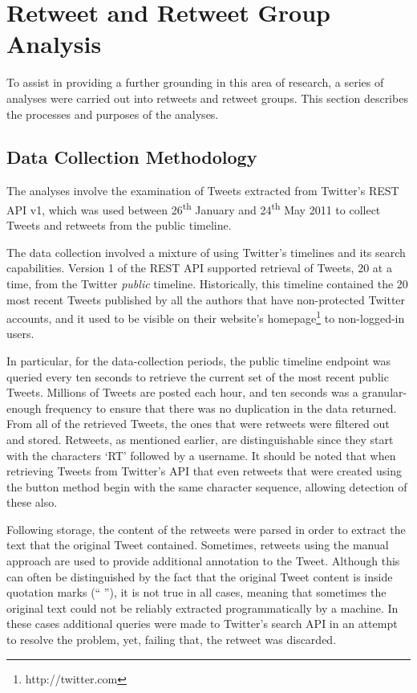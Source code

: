 \section{Retweet and Retweet Group Analysis}
To assist in providing a further grounding in this area of research, a series of analyses were carried out into retweets and retweet groups. This section describes the processes and purposes of the analyses.


\subsection{Data Collection Methodology}
The analyses involve the examination of Tweets extracted from Twitter's REST API v1, which was used between 26\textsuperscript{th} January and 24\textsuperscript{th} May 2011 to collect Tweets and retweets from the public timeline.

The data collection involved a mixture of using Twitter's timelines and its search capabilities. Version 1 of the REST API supported retrieval of Tweets, 20 at a time, from the Twitter \textit{public} timeline. Historically, this timeline contained the 20 most recent Tweets published by all the authors that have non-protected Twitter accounts, and it used to be visible on their website's homepage\footnote{http://twitter.com} to non-logged-in users.

In particular, for the data-collection periods, the public timeline endpoint was queried every ten seconds to retrieve the current set of the most recent public Tweets. Millions of Tweets are posted each hour, and ten seconds was a granular-enough frequency to ensure that there was no duplication in the data returned. From all of the retrieved Tweets, the ones that were retweets were filtered out and stored. Retweets, as mentioned earlier, are distinguishable since they start with the characters `RT' followed by a username. It should be noted that when retrieving Tweets from Twitter's API that even retweets that were created using the button method begin with the same character sequence, allowing detection of these also.

Following storage, the content of the retweets were parsed in order to extract the text that the original Tweet contained. Sometimes, retweets using the manual approach are used to provide additional annotation to the Tweet. Although this can often be distinguished by the fact that the original Tweet content is inside quotation marks (`` ''), it is not true in all cases, meaning that sometimes the original text could not be reliably extracted programmatically by a machine. In these cases additional queries were made to Twitter's search API in an attempt to resolve the problem, yet, failing that, the retweet was discarded.

